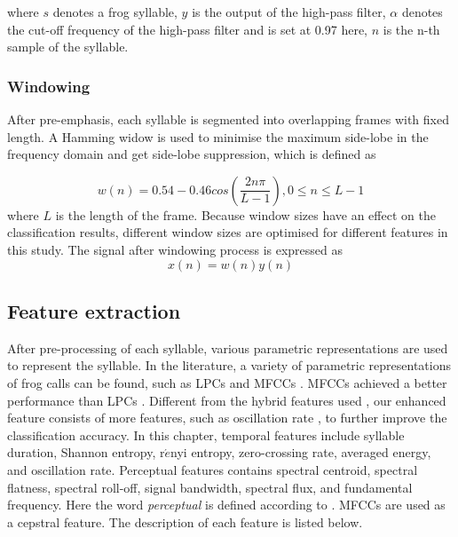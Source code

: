 where $s$ denotes a frog syllable, $y$ is the output of the high-pass filter, $\alpha$ denotes the cut-off frequency of the high-pass filter and is set at 0.97 here, $n$ is the n-th sample of the syllable. 

\subsubsection{Windowing}
After pre-emphasis, each syllable is segmented into overlapping frames with fixed length. A Hamming widow is used to minimise the maximum side-lobe in the frequency domain and get side-lobe suppression, which is defined as

\begin{equation}
w(n)=0.54-0.46cos(\frac{2n\pi}{L-1}), 0 \leq n \leq L-1
\end{equation}
where $L$ is the length of the frame. Because window sizes have an effect on the classification results, different window sizes are optimised for different features in this study. The signal after windowing process is expressed as
\begin{equation}
x(n) = w(n)y(n)
\end{equation}

\subsection{Feature extraction}
After pre-processing of each syllable, various parametric representations are used to represent the syllable. In the literature, a variety of parametric representations of frog calls can be found, such as LPCs and MFCCs \citep{yuan2012frog, jaafar2013automatic, bedoya2014automatic}.
MFCCs achieved a better performance than LPCs \citep{yuan2012frog}. Different from the hybrid features used \citep{huang2009frog, han2011acoustic, Gingras2013}, our enhanced  feature consists of more features, such as oscillation rate \citep{Xie1504:Acoustic}, to further improve the classification accuracy. In this chapter, temporal features include syllable duration, Shannon entropy, r$\acute{e}$nyi entropy, zero-crossing rate, averaged energy, and oscillation rate. Perceptual features contains spectral centroid, spectral flatness, spectral roll-off, signal bandwidth, spectral flux, and fundamental frequency. Here the word \textit{perceptual} is defined according to \citep{lei2014content}. MFCCs are used as a cepstral feature. The description of each feature is listed below.

\vspace{3mm}

